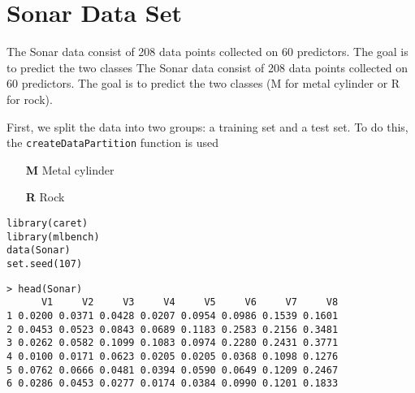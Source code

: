 \documentclass[caret-main.tex]{subfiles}
\begin{document}
\section{Sonar Data Set}
The Sonar data consist of 208 data points collected on 60 predictors. 
The goal is to predict the two classes
The Sonar data consist of 208 data points collected on 60 predictors. 
The goal is to predict the two classes (M for metal cylinder or R for rock).

First, we split the data into two groups: a training set and a test set. To do this, the \texttt{createDataPartition} function is used

\begin{itemize}
\item[\textbf{M}] Metal cylinder 
\item[\textbf{R}] Rock
\end{itemize}

\begin{framed}
\begin{verbatim}
library(caret)
library(mlbench)
data(Sonar)
set.seed(107)
\end{verbatim}
\end{framed}

\begin{verbatim}
> head(Sonar)
      V1     V2     V3     V4     V5     V6     V7     V8
1 0.0200 0.0371 0.0428 0.0207 0.0954 0.0986 0.1539 0.1601
2 0.0453 0.0523 0.0843 0.0689 0.1183 0.2583 0.2156 0.3481
3 0.0262 0.0582 0.1099 0.1083 0.0974 0.2280 0.2431 0.3771
4 0.0100 0.0171 0.0623 0.0205 0.0205 0.0368 0.1098 0.1276
5 0.0762 0.0666 0.0481 0.0394 0.0590 0.0649 0.1209 0.2467
6 0.0286 0.0453 0.0277 0.0174 0.0384 0.0990 0.1201 0.1833
\end{verbatim}
\end{document}

